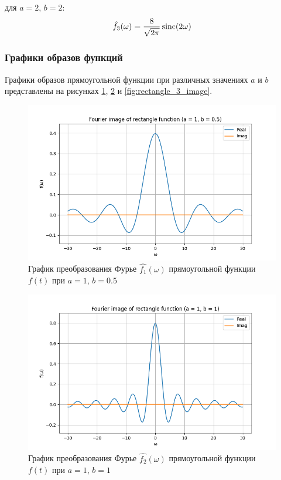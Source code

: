 для $a = 2$, $b = 2$:
\begin{equation}
    \hat{f_3}(\omega) = \frac{8}{\sqrt{2\pi}}\operatorname{sinc}(2\omega)
\end{equation}

\subsubsection{Графики образов функций}
Графики образов прямоугольной функции при различных значениях $a$ и $b$ представлены на рисунках \ref{fig:rectangle_1_image}, \ref{fig:rectangle_2_image} и \ref{fig:rectangle_3_image}.

\begin{figure}[ht!]
    \centering
    \includegraphics[width=\textwidth]{media/rectangle_1_image.png}
    \caption{График преобразования Фурье $\hat{f_1}(\omega)$ прямоугольной функции $f(t)$ при $a = 1$, $b = 0.5$}
    \label{fig:rectangle_1_image}
\end{figure}

\begin{figure}[ht!]
    \centering
    \includegraphics[width=\textwidth]{media/rectangle_2_image.png}
    \caption{График преобразования Фурье $\hat{f_2}(\omega)$ прямоугольной функции $f(t)$ при $a = 1$, $b = 1$}
    \label{fig:rectangle_2_image}
\end{figure}

